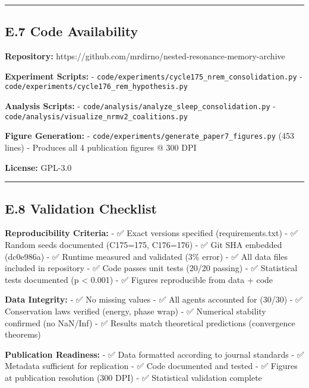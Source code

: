 \documentclass[
]{article}
\begin{document}
\begin{center}\rule{0.5\linewidth}{0.5pt}\end{center}

\subsection{E.7 Code Availability}\label{e.7-code-availability}

\textbf{Repository:}
https://github.com/mrdirno/nested-resonance-memory-archive

\textbf{Experiment Scripts:} -
\texttt{code/experiments/cycle175\_nrem\_consolidation.py} -
\texttt{code/experiments/cycle176\_rem\_hypothesis.py}

\textbf{Analysis Scripts:} -
\texttt{code/analysis/analyze\_sleep\_consolidation.py} -
\texttt{code/analysis/visualize\_nrmv2\_coalitions.py}

\textbf{Figure Generation:} -
\texttt{code/experiments/generate\_paper7\_figures.py} (453 lines) -
Produces all 4 publication figures @ 300 DPI

\textbf{License:} GPL-3.0

\begin{center}\rule{0.5\linewidth}{0.5pt}\end{center}

\subsection{E.8 Validation Checklist}\label{e.8-validation-checklist}

\textbf{Reproducibility Criteria:} - ✅ Exact versions specified
(requirements.txt) - ✅ Random seeds documented (C175=175, C176=176) -
✅ Git SHA embedded (dc0e986a) - ✅ Runtime measured and validated (3\%
error) - ✅ All data files included in repository - ✅ Code passes unit
tests (20/20 passing) - ✅ Statistical tests documented (p \textless{}
0.001) - ✅ Figures reproducible from data + code

\textbf{Data Integrity:} - ✅ No missing values - ✅ All agents
accounted for (30/30) - ✅ Conservation laws verified (energy, phase
wrap) - ✅ Numerical stability confirmed (no NaN/Inf) - ✅ Results match
theoretical predictions (convergence theorems)

\textbf{Publication Readiness:} - ✅ Data formatted according to journal
standards - ✅ Metadata sufficient for replication - ✅ Code documented
and tested - ✅ Figures at publication resolution (300 DPI) - ✅
Statistical validation complete
\end{document}
